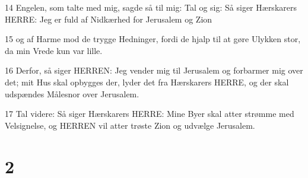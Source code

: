 \par 14 Engelen, som talte med mig, sagde så til mig: Tal og sig: Så siger Hærskarers HERRE: Jeg er fuld af Nidkærhed for Jerusalem og Zion
\par 15 og af Harme mod de trygge Hedninger, fordi de hjalp til at gøre Ulykken stor, da min Vrede kun var lille.
\par 16 Derfor, så siger HERREN: Jeg vender mig til Jerusalem og forbarmer mig over det; mit Hus skal opbygges der, lyder det fra Hærskarers HERRE, og der skal udspændes Målesnor over Jerusalem.
\par 17 Tal videre: Så siger Hærskarers HERRE: Mine Byer skal atter strømme med Velsignelse, og HERREN vil atter trøste Zion og udvælge Jerusalem.

\chapter{2}

